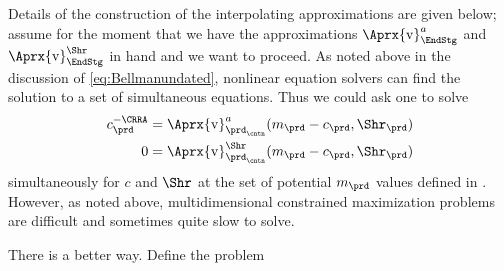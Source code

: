 \documentclass[titlepage, headings=optiontotocandhead]{econtex}
\begin{document}
Details of the construction of the interpolating approximations are given below; assume for the moment that we have the approximations $\Aprx{\mathrm{v}}_{\EndStg}^{a}$ and $\Aprx{\mathrm{v}}_{\EndStg}^{\Shr}$ in hand and we want to proceed.  As noted above in the discussion of \eqref{eq:Bellmanundated}, nonlinear equation solvers can find the solution to a set of simultaneous equations.  Thus we could ask one to solve
\begin{equation}\begin{gathered}\begin{aligned}
      c_{\prd}^{-\CRRA}  & = \Aprx{\mathrm{v}}^{a}_{{\prd_\cntn}}(m_{\prd}-c_{\prd},\Shr_{\prd}) %
      \\      0  & = \Aprx{\mathrm{v}}^{\Shr}_{{\prd_\cntn}}(m_{\prd}-c_{\prd},\Shr_{\prd}) \label{eq:FOCwrtw}
    \end{aligned}\end{gathered}\end{equation}
simultaneously for $c$ and $\Shr$ at the set of potential $m_{\prd}$ values defined in {\mVec}. However, as noted above, multidimensional constrained
maximization problems are difficult and sometimes quite slow to
solve.

There is a better way.  Define the problem
\end{document}
